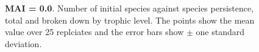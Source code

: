 \begin{figure}
	\centering	
	\renewcommand{\thesubfigure}{}
	\setlength{\subfloatlabelskip}{0pt}
	\caption{\textbf{MAI = 0.0}. Number of initial species against species persistence, total and broken down by trophic level. The points show the mean value over 25 replciates and the error bars show $\pm$ one standard deviation.}
	\label{fig:nsp_v_comp_mai00}
\end{figure}


